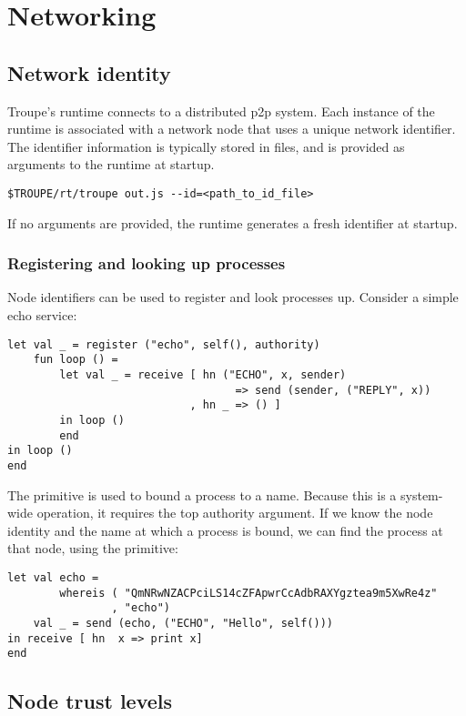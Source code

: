 \section{Networking}
\label{sec:network}

\subsection{Network identity}
Troupe's runtime connects to a distributed p2p system. 
Each instance of the runtime is associated with a network node that uses a
unique network identifier. The identifier information is typically stored in files,
and is provided as arguments to the runtime at startup.
\begin{verbatim}
$TROUPE/rt/troupe out.js --id=<path_to_id_file>    
\end{verbatim}
If no arguments are provided, the runtime generates a fresh identifier at startup.


\subsubsection{Registering and looking up processes}

Node identifiers can be used to register and look processes up.
Consider a simple echo service:
\label{example:echo}
\begin{lstlisting}
let val _ = register ("echo", self(), authority)
    fun loop () =
        let val _ = receive [ hn ("ECHO", x, sender) 
                                   => send (sender, ("REPLY", x))
                            , hn _ => () ]
        in loop ()
        end
in loop ()
end
\end{lstlisting}
The  primitive is used to bound a process to a name. Because this is a
system-wide operation, it requires the top authority argument.  If we know 
the node identity and the name at which a process is bound, we can find the process at that node, using the 
 primitive:


\begin{lstlisting}
let val echo = 
        whereis ( "QmNRwNZACPciLS14cZFApwrCcAdbRAXYgztea9m5XwRe4z"
                , "echo")
    val _ = send (echo, ("ECHO", "Hello", self()))
in receive [ hn  x => print x]
end    
\end{lstlisting}



\subsection{Node trust levels}

